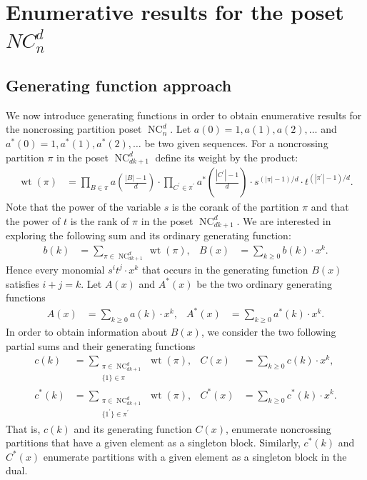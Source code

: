 \documentclass[11pt]{amsart}
\numberwithin{equation}{section}
\DeclareMathOperator{\wt}{wt}
\DeclareMathOperator{\NC}{NC}
\begin{document}
\section{Enumerative results for the poset $NC^{d}_{n}$}
\label{section_Enumerative}

\subsection{Generating function approach}
\label{subsection_Generating}

We now introduce generating functions in order to obtain
enumerative results for the noncrossing partition poset $\NC^{d}_{n}$.
Let $a(0) = 1, a(1), a(2), \ldots$
and $a^{*}(0) = 1, a^{*}(1), a^{*}(2), \ldots$
be two given sequences.
For a noncrossing partition $\pi$ in the poset $\NC^{d}_{dk+1}$
define its weight by the product:
\begin{align*}
\wt(\pi)
& =
\prod_{B \in \pi} a\left(\frac{|B|-1}{d}\right)
\cdot
\prod_{C^{\prime} \in \pi^{\prime}} a^{*}\left(\frac{|C^{\prime}|-1}{d}\right)
\cdot
s^{({|\pi|-1})/{d}}
\cdot
t^{({|\pi^{\prime}|-1})/{d}} .
\end{align*}
Note that the power of the variable $s$ is the corank of the partition $\pi$
and that the power of $t$ is the rank of $\pi$
in the poset $\NC^{d}_{dk+1}$.
We are interested in  exploring the following sum and its ordinary generating function:
\begin{align}
b(k)
& =
\sum_{\pi \in \NC^{d}_{dk+1}}
\wt(\pi) ,
&
B(x)
& =
\sum_{k \geq 0} b(k) \cdot x^{k} .
\label{equation_b_k}
\end{align}
Hence every monomial $s^{i} t^{j} \cdot x^{k}$ that occurs
in the generating function $B(x)$ satisfies $i+j=k$.
Let $A(x)$ and $A^{*}(x)$ be the two ordinary generating functions
\begin{align*}
A(x) & = \sum_{k \geq 0} a(k) \cdot x^{k} ,
&
A^{*}(x) & = \sum_{k \geq 0} a^{*}(k) \cdot x^{k} .
\end{align*}
In order to obtain information about $B(x)$, we consider the two following partial sums
and their generating functions
\begin{align*}
c(k)
& =
\sum_{\substack{\pi \in \NC^{d}_{dk+1} \\ \{1\} \in \pi}}
\wt(\pi) ,
&
C(x)
& =
\sum_{k \geq 0} c(k) \cdot x^{k} , \\
c^{*}(k)
& =
\sum_{\substack{\pi \in \NC^{d}_{dk+1} \\ \{1^{\prime}\} \in \pi^{\prime}}}
\wt(\pi) ,
&
C^{*}(x)
& =
\sum_{k \geq 0} c^{*}(k) \cdot x^{k} .
\end{align*}
That is, $c(k)$ and its generating function $C(x)$, enumerate
noncrossing partitions that have a given element as a singleton block.
Similarly, $c^{*}(k)$ and $C^{*}(x)$ enumerate partitions
with a given element as a singleton block in the dual.
\end{document}
